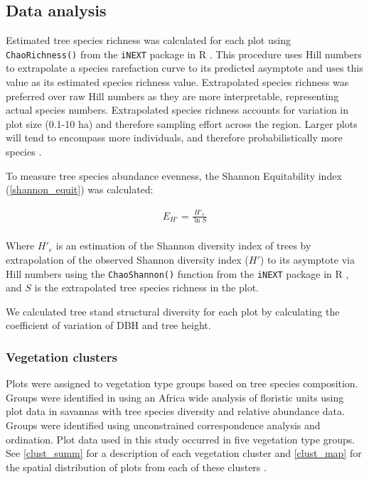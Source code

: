 \documentclass[11pt,a4paper]{article}
\begin{document}
\subsection{Data analysis}
Estimated tree species richness was calculated for each plot using \verb|ChaoRichness()| from the \verb|iNEXT| package in R \citep{Hsieh2016}. This procedure uses Hill numbers to extrapolate a species rarefaction curve to its predicted asymptote and uses this value as its estimated species richness value. Extrapolated species richness was preferred over raw Hill numbers as they are more interpretable, representing actual species numbers. Extrapolated species richness accounts for variation in plot size (0.1-10 ha) and therefore sampling effort across the region. Larger plots will tend to encompass more individuals, and therefore probabilistically more species \citep{}.

To measure tree species abundance evenness, the Shannon Equitability index \citep{} (\autoref{shannon_equit}) was calculated: 

\begin{equation}
	\begin{gathered}
		E_{H'} = \frac{H'_{e}}{\ln{S}} \\
	\end{gathered}
	\label{shannon_equit}
\end{equation}

Where $H'_{e}$ is an estimation of the Shannon diversity index of trees by extrapolation of the observed Shannon diversity index ($H'$) to its asymptote via Hill numbers using the \verb|ChaoShannon()| function from the \verb|iNEXT| package in R \citep{Hsieh2016}, and $S$ is the extrapolated tree species richness in the plot.

We calculated tree stand structural diversity for each plot by calculating the coefficient of variation of DBH and tree height. 

\subsubsection{Vegetation clusters}

Plots were assigned to vegetation type groups based on tree species composition. Groups were identified in \citet{Fayolle2018} using an Africa wide analysis of floristic units using plot data in savannas with tree species diversity and relative abundance data. Groups were identified using unconstrained correspondence analysis and ordination. Plot data used in this study occurred in five vegetation type groups. See \autoref{clust_summ} for a description of each vegetation cluster and \autoref{clust_map} for the spatial distribution of plots from each of these clusters .
\end{document}
